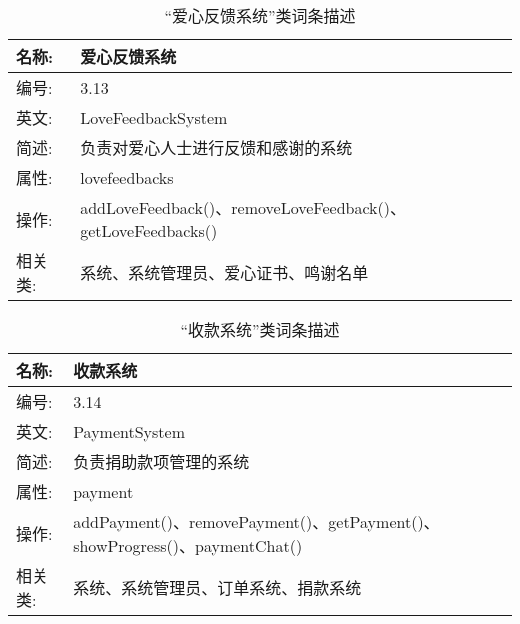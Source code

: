 \begin{table}[H]  
\caption{“爱心反馈系统”类词条描述}  
\begin{center}  
    \begin{tabular}{l p{11cm}} 
        \hline
        \quad 名称:  &  爱心反馈系统 \\
        \hline
        \quad 编号:  & 3.13 \\
        \hline
        \quad 英文:  &  LoveFeedbackSystem \\
        \hline
        \quad 简述:  & 负责对爱心人士进行反馈和感谢的系统 \\
        \hline
        \quad 属性:  & lovefeedbacks\\
        \hline
        \quad 操作:  & addLoveFeedback()、removeLoveFeedback()、getLoveFeedbacks()\\
        \hline
        \quad 相关类:  & 系统、系统管理员、爱心证书、鸣谢名单 \\
        \hline
    \end{tabular}
\end{center}
\end{table}

\begin{table}[H]  
\caption{“收款系统”类词条描述}  
\begin{center}  
    \begin{tabular}{l p{11cm}} 
        \hline
        \quad 名称:  &  收款系统 \\
        \hline
        \quad 编号:  & 3.14 \\
        \hline
        \quad 英文:  &  PaymentSystem \\
        \hline
        \quad 简述:  & 负责捐助款项管理的系统 \\
        \hline
        \quad 属性:  & payment\\
        \hline
        \quad 操作:  & addPayment()、removePayment()、getPayment()、showProgress()、paymentChat()
\\
        \hline
        \quad 相关类:  & 系统、系统管理员、订单系统、捐款系统 \\
        \hline
    \end{tabular}
\end{center}
\end{table}

